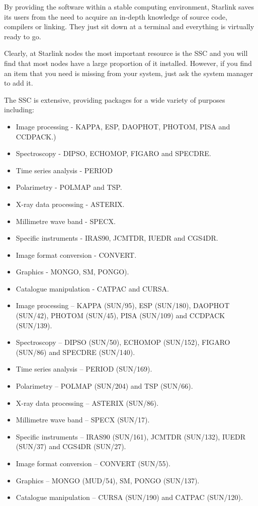 \documentclass[twoside,11pt]{article}
\newenvironment{latexonly}{}{}
\newcommand{\xref}[3]{#1}
\newcommand{\CCDPACKref}{\xref{CCDPACK}{sun139}{}}
\newcommand{\ESPref}{\xref{ESP}{sun180}{}}
\newcommand{\FIGAROref}{\xref{FIGARO}{sun86}{}}
\newcommand{\KAPPAref}{\xref{KAPPA}{sun95}{}}
\newcommand{\DAOPHOTref}{\xref{DAOPHOT}{sun42}{}}
\newcommand{\PHOTOMref}{\xref{PHOTOM}{sun45}{}}
\newcommand{\PISAref}{\xref{PISA}{sun109}{}}
\newcommand{\DIPSOref}{\xref{DIPSO}{sun50}{}}
\newcommand{\ECHOMOPref}{\xref{ECHOMOP}{sun152}{}}
\newcommand{\SPECDREref}{\xref{SPECDRE}{sun140}{}}
\newcommand{\PERIODref}{\xref{PERIOD}{sun167}{}}
\newcommand{\POLMAPref}{\xref{POLMAP}{sun204}{}}
\newcommand{\TSPref}{\xref{TSP}{sun66}{}}
\newcommand{\CATPACref}{\xref{CATPAC}{sun120}{}}
\newcommand{\CURSAref}{\xref{CURSA}{sun190}{}}
\newcommand{\ASTERIXref}{\xref{ASTERIX}{sun98}{}}
\newcommand{\SPECXref}{\xref{SPECX}{sun17}{}}
\newcommand{\IRASref}{\xref{IRAS90}{sun161}{}}
\newcommand{\JCMTDRref}{\xref{JCMTDR}{sun132}{}}
\newcommand{\IUEDRref}{\xref{IUEDR}{sun37}{}}
\newcommand{\CGSDRref}{\xref{CGS4DR}{sun27}{}}
\newcommand{\CONVERTref}{\xref{CONVERT}{sun55}{}}
\newcommand{\PONGOref}{\xref{PONGO}{sun137}{}}
\begin{document}
By providing the software within a stable computing environment,
Starlink saves its users from the need to 
acquire an in-depth knowledge of source code, compilers or linking. They
just sit down at a terminal and everything is virtually ready to go.

Clearly, at Starlink nodes the most important resource is the SSC
and you will find that most nodes have a large proportion of it installed. 
However, if you find an item that you need is missing from your system,
just ask the system manager to add it. 

The SSC is extensive, providing packages for a wide variety of purposes 
including:

\begin{htmlonly}
\begin{itemize}
\item Image processing - {\KAPPAref}, {\ESPref}, {\DAOPHOTref}, {\PHOTOMref}, {\PISAref} and {\CCDPACKref}.) 
\item Spectroscopy - {\DIPSOref}, {\ECHOMOPref}, {\FIGAROref} and 
      {\SPECDREref}.
\item Time series analysis - {\PERIODref}
\item Polarimetry - {\POLMAPref} and {\TSPref}.
\item X-ray data processing - {\ASTERIXref}.
\item Millimetre wave band - {\SPECXref}.
\item Specific instruments - {\IRASref}, {\JCMTDRref}, {\IUEDRref} and {\CGSDRref}.
\item Image format conversion - {\CONVERTref}.
\item Graphics - MONGO, SM, {\PONGOref}). 
\item Catalogue manipulation - {\CATPACref} and {\CURSAref}.
\end{itemize}
\end{htmlonly}
\begin{latexonly}
\begin{itemize}
\item Image processing -- KAPPA (SUN/95), ESP (SUN/180), DAOPHOT (SUN/42), 
      PHOTOM (SUN/45), PISA (SUN/109) and CCDPACK (SUN/139). 
\item Spectroscopy -- DIPSO (SUN/50), ECHOMOP (SUN/152), FIGARO (SUN/86) and SPECDRE (SUN/140).
\item Time series analysis -- PERIOD (SUN/169).
\item Polarimetry -- POLMAP (SUN/204) and TSP (SUN/66).
\item X-ray data processing -- ASTERIX (SUN/86).
\item Millimetre wave band -- SPECX (SUN/17).
\item Specific instruments -- IRAS90 (SUN/161), JCMTDR (SUN/132), IUEDR (SUN/37) and CGS4DR (SUN/27).
\item Image format conversion -- CONVERT (SUN/55).
\item Graphics -- MONGO (MUD/54), SM, PONGO (SUN/137). 
\item Catalogue manipulation -- CURSA (SUN/190) and CATPAC (SUN/120).
\end{itemize}
\end{latexonly}
\end{document}
